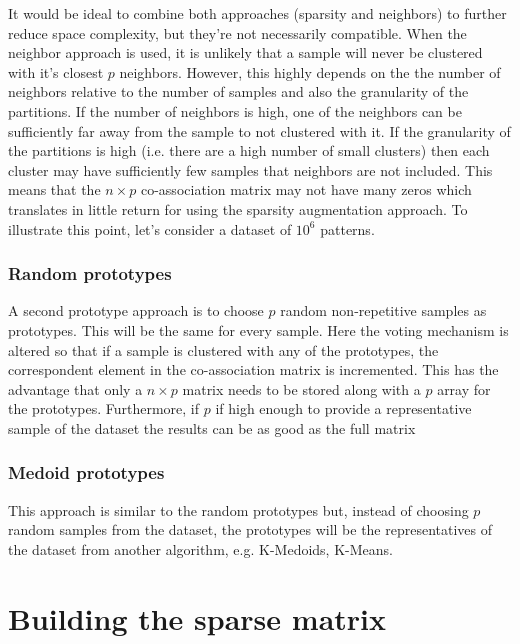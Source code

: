 It would be ideal to combine both approaches (sparsity and neighbors) to further reduce space complexity, but they're not necessarily compatible.
When the neighbor approach is used, it is unlikely that a sample will never be clustered with it's closest $p$ neighbors.
However, this highly depends on the the number of neighbors relative to the number of samples and also the granularity of the partitions.
If the number of neighbors is high, one of the neighbors can be sufficiently far away from the sample to not clustered with it.
If the granularity of the partitions is high (i.e. there are a high number of small clusters) then each cluster may have sufficiently few samples that neighbors are not included.
This means that the $n \times p$ co-association matrix may not have many zeros which translates in little return for using the sparsity augmentation approach.
To illustrate this point, let's consider a dataset of $10^6$ patterns. 


\subsubsection{Random prototypes}
A second prototype approach is to choose $p$ random non-repetitive samples as prototypes.
This will be the same for every sample.
Here the voting mechanism is altered so that if a sample is clustered with any of the prototypes, the correspondent element in the co-association matrix is incremented.
This has the advantage that only a $n \times p$ matrix needs to be stored along with a $p$ array for the prototypes.
Furthermore, if $p$ if high enough to provide a representative sample of the dataset the results can be as good as the full matrix

\subsubsection{Medoid prototypes}
This approach is similar to the random prototypes but, instead of choosing $p$ random samples from the dataset, the prototypes will be the representatives of the dataset from another algorithm, e.g. K-Medoids, K-Means.


\section{Building the sparse matrix}

